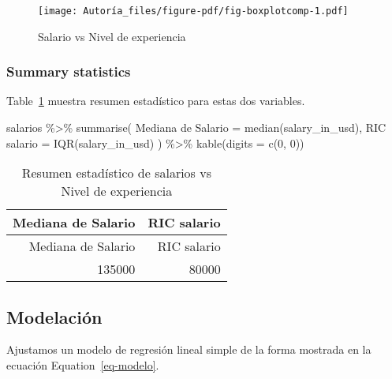 \documentclass[
  letterpaper,
  DIV=11,
  numbers=noendperiod]{scrartcl}
\newenvironment{Shaded}{\begin{snugshade}}{\end{snugshade}}
\newcommand{\AttributeTok}[1]{\textcolor[rgb]{0.40,0.45,0.13}{#1}}
\newcommand{\DecValTok}[1]{\textcolor[rgb]{0.68,0.00,0.00}{#1}}
\newcommand{\FunctionTok}[1]{\textcolor[rgb]{0.28,0.35,0.67}{#1}}
\newcommand{\NormalTok}[1]{\textcolor[rgb]{0.00,0.23,0.31}{#1}}
\newcommand{\OtherTok}[1]{\textcolor[rgb]{0.00,0.23,0.31}{#1}}
\newcommand{\SpecialCharTok}[1]{\textcolor[rgb]{0.37,0.37,0.37}{#1}}
\newcommand{\StringTok}[1]{\textcolor[rgb]{0.13,0.47,0.30}{#1}}
\begin{document}
\begin{figure}[H]

{\centering \texttt{[image: Autoría\_files/figure-pdf/fig-boxplotcomp-1.pdf]}

}

\caption{\label{fig-boxplotcomp}Salario vs Nivel de experiencia}

\end{figure}

\hypertarget{summary-statistics}{%
\subsubsection{Summary statistics}\label{summary-statistics}}

Table~\ref{tbl-stats} muestra resumen estadístico para estas dos
variables.

\begin{Shaded}
\begin{Highlighting}[]
\NormalTok{salarios }\SpecialCharTok{\%\textgreater{}\%}
  \FunctionTok{summarise}\NormalTok{(}
    \StringTok{\textasciigrave{}}\AttributeTok{Mediana de Salario}\StringTok{\textasciigrave{}} \OtherTok{=} \FunctionTok{median}\NormalTok{(salary\_in\_usd),}
    \StringTok{\textasciigrave{}}\AttributeTok{RIC salario}\StringTok{\textasciigrave{}} \OtherTok{=} \FunctionTok{IQR}\NormalTok{(salary\_in\_usd)}
\NormalTok{  ) }\SpecialCharTok{\%\textgreater{}\%}
  \FunctionTok{kable}\NormalTok{(}\AttributeTok{digits =} \FunctionTok{c}\NormalTok{(}\DecValTok{0}\NormalTok{, }\DecValTok{0}\NormalTok{))}
\end{Highlighting}
\end{Shaded}

\hypertarget{tbl-stats}{}
\begin{longtable}[]{@{}rr@{}}
\caption{\label{tbl-stats}Resumen estadístico de salarios vs Nivel de
experiencia}\tabularnewline
\toprule()
Mediana de Salario & RIC salario \\
\midrule()
\endfirsthead
\toprule()
Mediana de Salario & RIC salario \\
\midrule()
\endhead
135000 & 80000 \\
\bottomrule()
\end{longtable}

\hypertarget{sec-modelo}{%
\subsection{Modelación}\label{sec-modelo}}

Ajustamos un modelo de regresión lineal simple de la forma mostrada en
la ecuación Equation~\ref{eq-modelo}.
\end{document}
